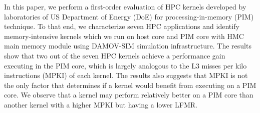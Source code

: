 In this paper, we perform a first-order evaluation of HPC kernels developed by laboratories of US Department of Energy (DoE) for processing-in-memory (PIM) technique. To that end, we characterize seven HPC applications and identify memory-intensive kernels which we run on host core and PIM core with HMC main memory module using DAMOV-SIM simulation infrastructure. The results show that two out of the seven HPC kernels achieve a performance gain executing in the PIM core, which is largely analogous to the L3 misses per kilo instructions (MPKI) of each kernel. The results also suggests that MPKI is not the only factor that determines if a kernel would benefit from executing on a PIM core. We observe that a kernel may perform relatively better on a PIM core than another kernel with a higher MPKI but having a lower LFMR. 